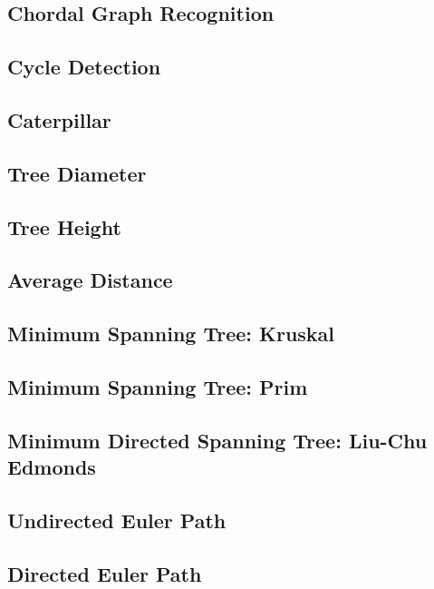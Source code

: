\documentclass{article}
\begin{document}
    \subsection{Chordal Graph Recognition}
        
    \subsection{Cycle Detection}
    \subsection{Caterpillar}
    \subsection{Tree Diameter}
        
    \subsection{Tree Height}
        
    \subsection{Average Distance}
        
    \subsection{Minimum Spanning Tree: Kruskal}
        
    \subsection{Minimum Spanning Tree: Prim}
        
    \subsection{Minimum Directed Spanning Tree: Liu-Chu Edmonds}
        
    \subsection{Undirected Euler Path}
    \subsection{Directed Euler Path}
        
\end{document}

